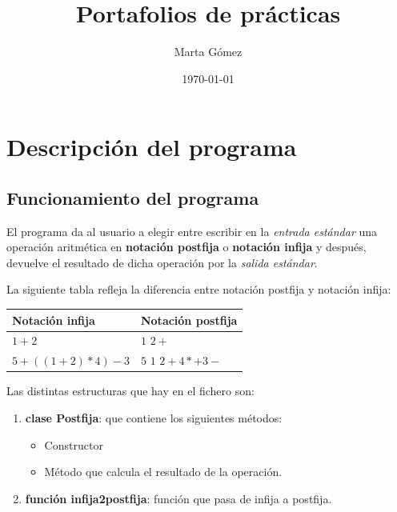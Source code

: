 \documentclass[11pt,a4paper]{article}
\begin{document}
\title{\huge Portafolios de prácticas}
\author{Marta Gómez}
\date{\today}

\maketitle %
\tableofcontents %

\setcounter{section}{-1} %
\section{Descripción del programa}
\subsection{Funcionamiento del programa}
\noindent
El programa da al usuario a elegir entre escribir en la \textit{entrada estándar} una operación aritmética en \textbf{notación postfija} o \textbf{notación infija} y después, devuelve el resultado de dicha operación por la \textit{salida estándar}.

\noindent
La siguiente tabla refleja la diferencia entre notación postfija y notación infija:

\begin{tabular}{|p{4cm} | p{4cm} |}
\hline %
Notación infija & Notación postfija \\ %
\hline
$1 + 2$ & $1$ $2 +$ \\
$5 + ((1 + 2) * 4) - 3$ &  $5$ $1$ $2 + 4 * + 3 -$ \\
\hline
\end{tabular}

\noindent
Las distintas estructuras que hay en el fichero son:

\begin{enumerate}[1.]
	\item \textbf{clase Postfija}: que contiene los siguientes métodos:
	\begin{itemize}
		\item Constructor
		\item Método que calcula el resultado de la operación.
	\end{itemize}
	\item \textbf{función infija2postfija}: función que pasa de infija a postfija.
\end{enumerate}
\end{document}
